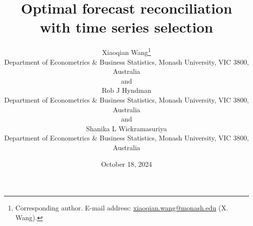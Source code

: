 \documentclass[
  11pt]{article}
\theoremstyle{plain}
\theoremstyle{remark}
\begin{document}
\def\spacingset#1{\renewcommand{\baselinestretch}%
{#1}\small\normalsize} \spacingset{1}

\renewcommand*{\arraystretch}{0.5} %


\date{October 18, 2024}
\title{\bf Optimal forecast reconciliation with time series selection}
\author{
Xiaoqian Wang\thanks{Corresponding author. E-mail address:
\href{mailto:xiaoqian.wang@monash.edu}{xiaoqian.wang@monash.edu} (X.
Wang).} \vspace{0.2em}\\
Department of Econometrics \& Business Statistics, Monash University,
VIC 3800, Australia \vspace{0.2em}\\
and \vspace{0.2em}\\Rob J Hyndman \vspace{0.2em}\\
Department of Econometrics \& Business Statistics, Monash University,
VIC 3800, Australia \vspace{0.2em}\\
and \vspace{0.2em}\\Shanika L Wickramasuriya \vspace{0.2em}\\
Department of Econometrics \& Business Statistics, Monash University,
VIC 3800, Australia \vspace{0.2em}\\
}
\maketitle
\end{document}
